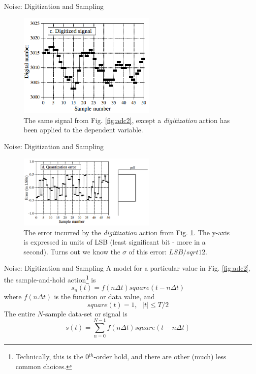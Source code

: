 \documentclass{beamer}
\begin{document}
\begin{frame}[fragile]{Noise: Digitization and Sampling}
\begin{figure}
\centering
\includegraphics[width=0.6\textwidth]{figures/adc_dac3.png}
\caption{\label{fig:adc3} The same signal from Fig. \ref{fig:adc2}, except a \textit{digitization} action has been applied to the dependent variable.}
\end{figure}
\end{frame}

\begin{frame}[fragile]{Noise: Digitization and Sampling}
\begin{figure}
\centering
\includegraphics[width=0.6\textwidth]{figures/adc_dac4.png}
\caption{\label{fig:adc4} The error incurred by the \textit{digitization} action from Fig. \ref{fig:adc3}.  The y-axis is expressed in units of LSB (least significant bit - more in a second). Turns out we know the $\sigma$ of this error: $LSB/sqrt{12}$.}
\end{figure}
\end{frame}

\begin{frame}[fragile]{Noise: Digitization and Sampling}
A model for a particular value in Fig. \ref{fig:adc2}, the sample-and-hold action\footnote{Technically, this is the 0$^{th}$-order hold, and there are other (much) less common choices.} is
\begin{equation}
s_n(t) = f(n\Delta t) square(t-n\Delta t)
\end{equation}
where $f(n\Delta t)$ is the function or data value, and 
\begin{equation}
square(t) = 1, ~~~ |t| \leq T/2
\end{equation}
The entire $N$-sample data-set or signal is
\begin{equation}
s(t) = \sum_{n=0}^{N-1} f(n\Delta t) square(t-n\Delta t)
\end{equation}
\end{frame}
\end{document}
